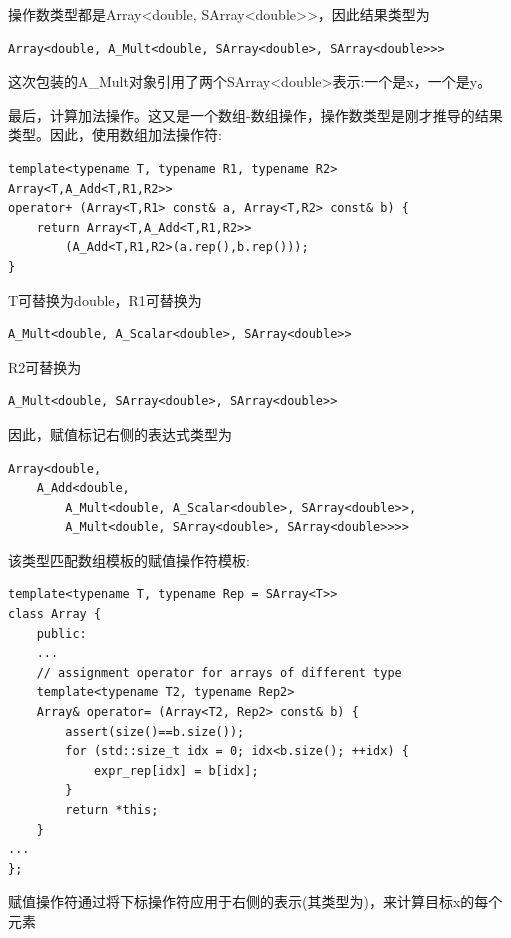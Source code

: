 操作数类型都是Array<double, SArray<double>>，因此结果类型为

\begin{lstlisting}[style=styleCXX]
Array<double, A_Mult<double, SArray<double>, SArray<double>>>
\end{lstlisting}

这次包装的A\_Mult对象引用了两个SArray<double>表示:一个是x，一个是y。

最后，计算加法操作。这又是一个数组-数组操作，操作数类型是刚才推导的结果类型。因此，使用数组加法操作符:

\begin{lstlisting}[style=styleCXX]
template<typename T, typename R1, typename R2>
Array<T,A_Add<T,R1,R2>>
operator+ (Array<T,R1> const& a, Array<T,R2> const& b) {
	return Array<T,A_Add<T,R1,R2>>
		(A_Add<T,R1,R2>(a.rep(),b.rep()));
}
\end{lstlisting}

T可替换为double，R1可替换为

\begin{lstlisting}[style=styleCXX]
A_Mult<double, A_Scalar<double>, SArray<double>>
\end{lstlisting}

R2可替换为

\begin{lstlisting}[style=styleCXX]
A_Mult<double, SArray<double>, SArray<double>>
\end{lstlisting}

因此，赋值标记右侧的表达式类型为

\begin{lstlisting}[style=styleCXX]
Array<double,
	A_Add<double,
		A_Mult<double, A_Scalar<double>, SArray<double>>,
		A_Mult<double, SArray<double>, SArray<double>>>>
\end{lstlisting}

该类型匹配数组模板的赋值操作符模板:

\begin{lstlisting}[style=styleCXX]
template<typename T, typename Rep = SArray<T>>
class Array {
	public:
	...
	// assignment operator for arrays of different type
	template<typename T2, typename Rep2>
	Array& operator= (Array<T2, Rep2> const& b) {
		assert(size()==b.size());
		for (std::size_t idx = 0; idx<b.size(); ++idx) {
			expr_rep[idx] = b[idx];
		}
		return *this;
	}
...
};
\end{lstlisting}

赋值操作符通过将下标操作符应用于右侧的表示(其类型为)，来计算目标x的每个元素

